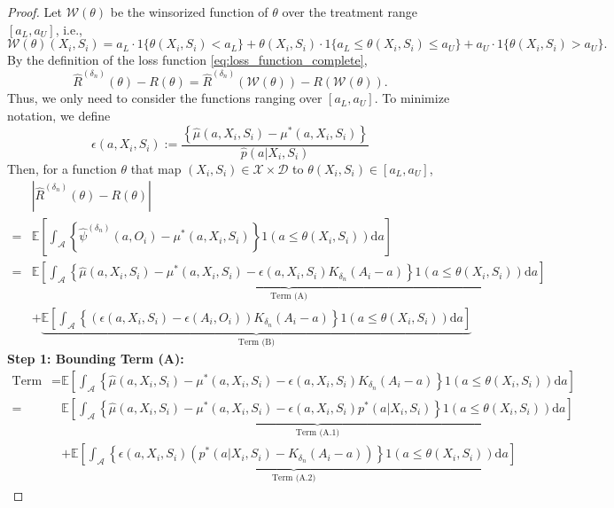 \documentclass[12pt]{article}
\newcommand{\E}{\mathbb{E}}
\begin{document}
\begin{proof} 
Let $\mathcal{W}(\theta)$ be the winsorized function of $\theta$ over the treatment range $[a_L,a_U]$, i.e., 
$$\mathcal{W}(\theta)(X_i,S_i) = a_L \cdot 1\{\theta(X_i,S_i)< a_L\} + \theta(X_i,S_i)\cdot 1\{a_L\leq \theta(X_i,S_i)\leq a_U\} + a_U \cdot 1\{\theta(X_i,S_i)> a_U\}.$$
By the definition of the loss function \eqref{eq:loss_function_complete}, 
$$\widehat R^{({\delta_n})}(\theta) - R(\theta) = \widehat R^{({\delta_n})}(\mathcal{W}(\theta)) - R(\mathcal{W}(\theta)).$$
Thus, we only need to consider the functions ranging over $[a_L,a_U]$. To minimize notation, we define
$$\epsilon(a,X_i,S_i) := \frac{\left\{\widehat\mu(a,X_i,S_i) - \mu^*(a,X_i,S_i)\right\} }{\widehat{p}(a|X_i,S_i)}$$
Then, for a function $\theta$ that map $(X_i,S_i)\in\mathcal{X}\times \mathcal{D}$ to $\theta(X_i,S_i)\in[a_L,a_U]$, 
\begin{align*}
    &\left| \widehat R^{({\delta_n})}(\theta) - R(\theta) \right|\nonumber\\
    = & \E\left[\int_{\mathcal{A}} \left\{\widehat{\psi}^{({\delta_n})}(a, O_i)- \mu^*(a, X_i,S_i)\right\}1(a\leq \theta(X_i,S_i))\mathrm{d}a\right]\nonumber\\
    = &  \underbrace{\E\left[\int_{\mathcal{A}} \left\{\widehat{\mu}(a,X_i,S_i) - \mu^*(a,X_i,S_i) - \epsilon(a,X_i,S_i) K_{\delta_n}(A_i-a)\right\}1(a\leq \theta(X_i,S_i))\mathrm{d}a\right]}_{\text{Term (A)}}
    \\ 
     & + \underbrace{\E\left[\int_{\mathcal{A}} \left\{(\epsilon(a,X_i,S_i) - \epsilon(A_i,O_i)) K_{\delta_n}(A_i-a)\right\}1(a\leq \theta(X_i,S_i))\mathrm{d}a\right]}_{\text{Term (B)}}
\end{align*}
\noindent \textbf{Step 1: Bounding Term (A):}
\noindent
\begin{align*}
\text{Term (A)} = &\E\left[\int_{\mathcal{A}} \left\{\widehat{\mu}(a,X_i,S_i) - \mu^*(a,X_i,S_i) - \epsilon(a,X_i,S_i) K_{\delta_n}(A_i-a)\right\}1(a\leq \theta(X_i,S_i))\mathrm{d}a\right]\\
=& \underbrace{\E\left[\int_{\mathcal{A}} \left\{\widehat{\mu}(a,X_i,S_i) - \mu^*(a,X_i,S_i) - \epsilon(a,X_i,S_i)p^*(a|X_i,S_i)\right\}1(a\leq \theta(X_i,S_i))\mathrm{d}a\right]}_{\text{Term (A.1)}}\\
&+\underbrace{\E\left[\int_{\mathcal{A}} \left\{ \epsilon(a,X_i,S_i)(p^*(a|X_i,S_i) - K_{\delta_n}(A_i-a))\right\}1(a\leq \theta(X_i,S_i))\mathrm{d}a\right]}_{\text{Term (A.2)}}
\end{align*}


\end{proof}
\end{document}
